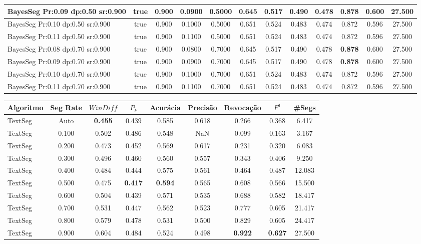 \documentclass{article}
\begin{document}
\begin{longtable}[c]{|l|c|c|c|c|c|c|c|c|c|c|c|}
 BayesSeg Pr:0.09 dp:0.50 sr:0.900 & true & 0.900 & 0.0900 & 0.5000 & 0.645 & 0.517 & 0.490 & 0.478 & \cellcolor{gray!20} \textbf{0.878} & 0.600 & 27.500  \\ \hline 
 BayesSeg Pr:0.10 dp:0.50 sr:0.900 & true & 0.900 & 0.1000 & 0.5000 & 0.651 & 0.524 & 0.483 & 0.474 & 0.872 & 0.596 & 27.500  \\ \hline 
 BayesSeg Pr:0.11 dp:0.50 sr:0.900 & true & 0.900 & 0.1100 & 0.5000 & 0.651 & 0.524 & 0.483 & 0.474 & 0.872 & 0.596 & 27.500  \\ \hline 
 BayesSeg Pr:0.08 dp:0.70 sr:0.900 & true & 0.900 & 0.0800 & 0.7000 & 0.645 & 0.517 & 0.490 & 0.478 & \cellcolor{gray!20} \textbf{0.878} & 0.600 & 27.500  \\ \hline 
 BayesSeg Pr:0.09 dp:0.70 sr:0.900 & true & 0.900 & 0.0900 & 0.7000 & 0.645 & 0.517 & 0.490 & 0.478 & \cellcolor{gray!20} \textbf{0.878} & 0.600 & 27.500  \\ \hline 
 BayesSeg Pr:0.10 dp:0.70 sr:0.900 & true & 0.900 & 0.1000 & 0.7000 & 0.651 & 0.524 & 0.483 & 0.474 & 0.872 & 0.596 & 27.500  \\ \hline 
 BayesSeg Pr:0.11 dp:0.70 sr:0.900 & true & 0.900 & 0.1100 & 0.7000 & 0.651 & 0.524 & 0.483 & 0.474 & 0.872 & 0.596 & 27.500  \\ \hline 
 \end{longtable} 
\newpage
\begin{longtable}[c]{|l|c|c|c|c|c|c|c|c|} 
\hline 
Algoritmo & Seg Rate & $WinDiff$ & $P_k$ & Acurácia & Precisão & Revocação & $F^1$ & \#Segs\\ \hline 
TextSeg & Auto & \cellcolor{gray!20} \textbf{0.455} & 0.439 & 0.585 & 0.618 & 0.266 & 0.368 & 6.417  \\ \hline 
 TextSeg & 0.100 & 0.502 & 0.486 & 0.548 & NaN & 0.099 & 0.163 & 3.167  \\ \hline 
 TextSeg & 0.200 & 0.473 & 0.452 & 0.569 & 0.617 & 0.231 & 0.320 & 6.083  \\ \hline 
 TextSeg & 0.300 & 0.496 & 0.460 & 0.560 & 0.557 & 0.343 & 0.406 & 9.250  \\ \hline 
 TextSeg & 0.400 & 0.484 & 0.444 & 0.575 & 0.561 & 0.464 & 0.487 & 12.083  \\ \hline 
 TextSeg & 0.500 & 0.475 & \cellcolor{gray!20} \textbf{0.417} & \cellcolor{gray!20} \textbf{0.594} & 0.565 & 0.608 & 0.566 & 15.500  \\ \hline 
 TextSeg & 0.600 & 0.504 & 0.439 & 0.571 & 0.535 & 0.688 & 0.582 & 18.417  \\ \hline 
 TextSeg & 0.700 & 0.531 & 0.447 & 0.562 & 0.523 & 0.777 & 0.605 & 21.417  \\ \hline 
 TextSeg & 0.800 & 0.579 & 0.478 & 0.531 & 0.500 & 0.829 & 0.605 & 24.417  \\ \hline 
 TextSeg & 0.900 & 0.604 & 0.484 & 0.524 & 0.498 & \cellcolor{gray!20} \textbf{0.922} & \cellcolor{gray!20} \textbf{0.627} & 27.500  \\ \hline 
 \end{longtable} 
\end{document}
